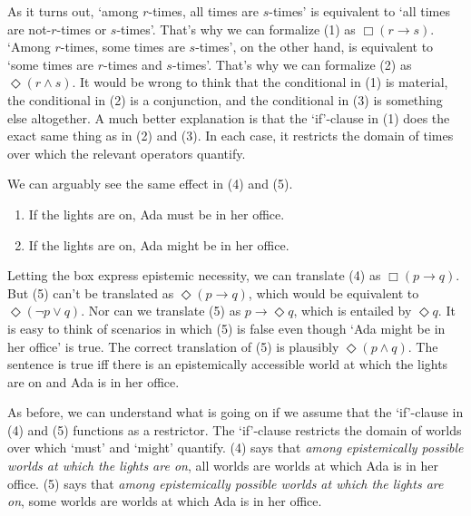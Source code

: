 As it turns out, `among $r$-times, all times are $s$-times' is equivalent to `all
times are not-$r$-times or $s$-times'. That's why we can formalize (1) as
$\Box(r \to s)$. `Among $r$-times, some times are $s$-times', on the other hand,
is equivalent to `some times are $r$-times and $s$-times'. That's why we can
formalize (2) as $\Diamond(r \land s)$. It would be wrong to think that the
conditional in (1) is material, the conditional in (2) is a conjunction, and the
conditional in (3) is something else altogether. A much better explanation is
that the `if'-clause in (1) does the exact same thing as in (2) and (3). In each
case, it restricts the domain of times over which the relevant operators
quantify.

We can arguably see the same effect in (4) and (5).
\begin{enumerate}[leftmargin=10mm]
  \itemsep-1mm  
  \item[(4)] If the lights are on, Ada must be in her office.
  \item[(5)] If the lights are on, Ada might be in her office.
\end{enumerate}
Letting the box express epistemic necessity, we can translate (4) as
$\Box(p \to q)$. But (5) can't be translated as $\Diamond(p \to q)$, which would
be equivalent to $\Diamond(\neg p \lor q)$. Nor can we translate (5) as
$p \to \Diamond q$, which is entailed by $\Diamond q$. It is easy to think of
scenarios in which (5) is false even though `Ada might be in her office' is
true. The correct translation of (5) is plausibly $\Diamond(p \land q)$. The
sentence is true iff there is an epistemically accessible world at which the
lights are on and Ada is in her office.

As before, we can understand what is going on if we assume that the `if'-clause in
(4) and (5) functions as a restrictor. The `if'-clause restricts the domain of
worlds over which `must' and `might' quantify. (4) says that \emph{among
  epistemically possible worlds at which the lights are on}, all worlds are
worlds at which Ada is in her office. (5) says that \emph{among epistemically
  possible worlds at which the lights are on}, some worlds are worlds at which
Ada is in her office.

